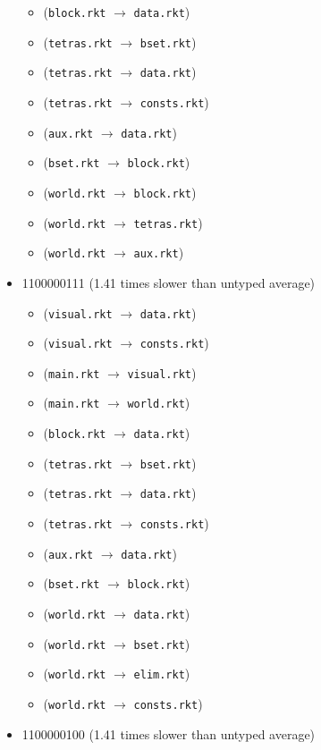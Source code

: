 \documentclass{article}
\newcommand{\mono}[1]{\texttt{#1}}
\begin{document}
\begin{itemize}
\begin{itemize}
  \item (\mono{block.rkt} $\rightarrow$ \mono{data.rkt})
  \item (\mono{tetras.rkt} $\rightarrow$ \mono{bset.rkt})
  \item (\mono{tetras.rkt} $\rightarrow$ \mono{data.rkt})
  \item (\mono{tetras.rkt} $\rightarrow$ \mono{consts.rkt})
  \item (\mono{aux.rkt} $\rightarrow$ \mono{data.rkt})
  \item (\mono{bset.rkt} $\rightarrow$ \mono{block.rkt})
  \item (\mono{world.rkt} $\rightarrow$ \mono{block.rkt})
  \item (\mono{world.rkt} $\rightarrow$ \mono{tetras.rkt})
  \item (\mono{world.rkt} $\rightarrow$ \mono{aux.rkt})
  \end{itemize}
\item 1100000111 (1.41 times slower than untyped average)
  \begin{itemize}
  \item (\mono{visual.rkt} $\rightarrow$ \mono{data.rkt})
  \item (\mono{visual.rkt} $\rightarrow$ \mono{consts.rkt})
  \item (\mono{main.rkt} $\rightarrow$ \mono{visual.rkt})
  \item (\mono{main.rkt} $\rightarrow$ \mono{world.rkt})
  \item (\mono{block.rkt} $\rightarrow$ \mono{data.rkt})
  \item (\mono{tetras.rkt} $\rightarrow$ \mono{bset.rkt})
  \item (\mono{tetras.rkt} $\rightarrow$ \mono{data.rkt})
  \item (\mono{tetras.rkt} $\rightarrow$ \mono{consts.rkt})
  \item (\mono{aux.rkt} $\rightarrow$ \mono{data.rkt})
  \item (\mono{bset.rkt} $\rightarrow$ \mono{block.rkt})
  \item (\mono{world.rkt} $\rightarrow$ \mono{data.rkt})
  \item (\mono{world.rkt} $\rightarrow$ \mono{bset.rkt})
  \item (\mono{world.rkt} $\rightarrow$ \mono{elim.rkt})
  \item (\mono{world.rkt} $\rightarrow$ \mono{consts.rkt})
  \end{itemize}
\item 1100000100 (1.41 times slower than untyped average)

\end{itemize}
\end{document}
